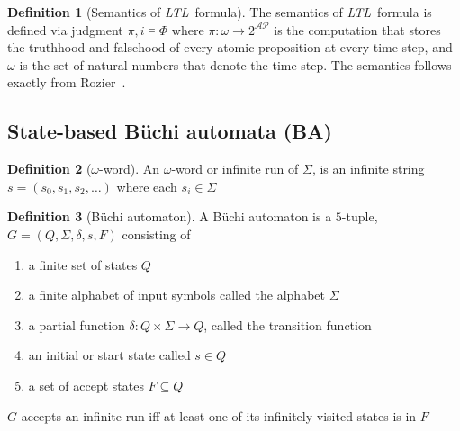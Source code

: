 \documentclass[preprint,12pt]{elsarticle}
\theoremstyle{definition}
\newtheorem{definition}{Definition}[section]
\theoremstyle{remark}
\newcommand{\AP}{\mathcal{AP}}
\newcommand{\ltl}{\textit{LTL}}
\newcommand{\Buchi}{B\"{u}chi }
\begin{document}
\begin{definition}[Semantics of \ltl\ formula]
    The semantics of \ltl\ formula is defined via judgment $\pi, i \models \Phi$ where $\pi : \omega \rightarrow 2^{\AP}$ is the computation that stores the truthhood and falsehood of every atomic proposition at every time step, and $\omega$ is the set of natural numbers that denote the time step. The semantics follows exactly from Rozier~\cite{Roz11}.
\end{definition}

\subsection{State-based \Buchi automata (BA)}
\begin{definition}[$\omega$-word]
    An $\omega$-word or infinite run of $\Sigma$, is an infinite string $s = (s_0, s_1, s_2, \dots)$ where each $s_i\in \Sigma$
\end{definition}
\begin{definition}[\Buchi automaton]
    A \Buchi automaton is a $5$-tuple, $G = (Q, \Sigma, \delta, s, F)$ consisting of
    \begin{enumerate}
        \item a finite set of states $Q$
        \item a finite alphabet of input symbols called the alphabet $\Sigma$
        \item a partial function $\delta : Q\times \Sigma \to Q$, called the transition function
        \item an initial or start state called $s\in Q$
        \item a set of accept states $F \subseteq Q$
    \end{enumerate}
    $G$ accepts an infinite run iff at least one of its infinitely visited states is in $F$
\end{definition}
\end{document}
